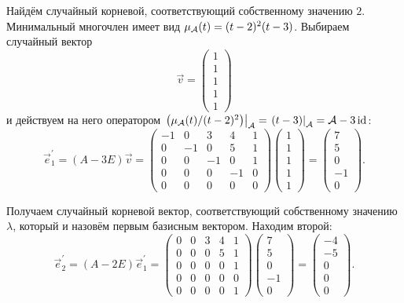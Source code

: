 \begin{solution}
	Найдём случайный корневой, соответствующий собственному значению $2$. Минимальный многочлен имеет вид $\mu_{\mathcal{A}}(t) = (t - 2)^2(t - 3)$. Выбираем случайный вектор
	\[
		\vec{v} =
		\begin{pmatrix}
			1\\
			1\\
			1\\
			1\\
			1
		\end{pmatrix}
	\]
	и действуем на него оператором $\left.\left(\mu_{\mathcal{A}}(t) / (t - 2)^2\right)\right|_{\mathcal{A}} = \left.(t - 3)\right|_{\mathcal{A}} = \mathcal{A} - 3\operatorname{id}$:
	\[
		\vec{e}^\prime_1 = (A - 3E)\vec{v} =
		\begin{pmatrix}
			-1 & 0 & 3 & 4 & 1\\
			0 & -1 & 0 & 5 & 1\\
			0 & 0 & -1 & 0 & 1\\
			0 & 0 & 0 & -1 & 0\\
			0 & 0 & 0 & 0 & 0
		\end{pmatrix}
		\begin{pmatrix}
			1\\
			1\\
			1\\
			1\\
			1
		\end{pmatrix} =
		\begin{pmatrix}
			7\\
			5\\
			0\\
			-1\\
			0
		\end{pmatrix}.
	\]

	Получаем случайный корневой вектор, соответствующий собственному значению $\lambda$, который и назовём первым базисным вектором. Находим второй:
	\[
		\vec{e}^\prime_2 = (A - 2E)\vec{e}^\prime_1 =
		\begin{pmatrix}
			0 & 0 & 3 & 4 & 1\\
			0 & 0 & 0 & 5 & 1\\
			0 & 0 & 0 & 0 & 1\\
			0 & 0 & 0 & 0 & 0\\
			0 & 0 & 0 & 0 & 1
		\end{pmatrix}
		\begin{pmatrix}
			7\\
			5\\
			0\\
			-1\\
			0
		\end{pmatrix} =
		\begin{pmatrix}
			-4\\
			-5\\
			0\\
			0\\
			0
		\end{pmatrix}.
	\]


\end{solution}
